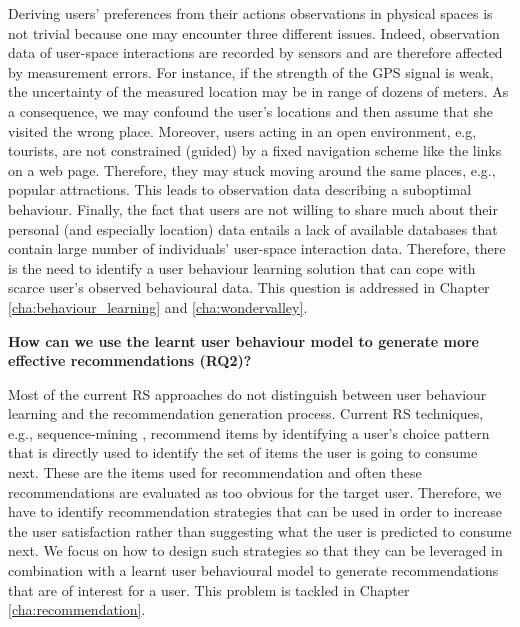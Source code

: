 Deriving users' preferences from their actions observations in physical spaces is not trivial because one may encounter three different issues.
Indeed, observation data of user-space interactions are recorded by sensors and are therefore affected by measurement errors. For instance, if the strength of the GPS signal is weak, the uncertainty of the measured location may be in range of dozens of meters. As a consequence, we may confound the user's locations and then assume that she visited the wrong place. Moreover, users acting in an open environment, e.g, tourists, are not constrained (guided) by a fixed navigation scheme like the links on a web page. Therefore, they may stuck moving around the same places, e.g., popular attractions. This leads to observation data describing a suboptimal behaviour. Finally, the fact that users are not willing to share much about their personal (and especially location) data \cite{location_privacy:Poikela2014} entails a lack of available databases that contain large number of individuals' user-space interaction data.
Therefore, there is the need to identify a user behaviour learning solution that can cope with scarce user's observed behavioural data. %
This question is addressed in Chapter \ref{cha:behaviour_learning} and \ref{cha:wondervalley}. \newline

\noindent\textbf{How can we use the learnt user behaviour model to generate more effective recommendations (RQ2)?}

Most of the current RS approaches do not distinguish between user behaviour learning and the recommendation  generation process. Current RS techniques, e.g., sequence-mining \cite{mobasher:2002, jannach2017}, recommend items by identifying a user's choice pattern that is directly used to identify the set of items the user is going to consume next. These are the items used for recommendation and often these recommendations are evaluated as too obvious for the target user.
Therefore, we have to identify recommendation strategies that can be used in order to increase the user satisfaction rather than suggesting what the user is predicted to consume next.
We focus on how to design such strategies so that they can be leveraged in combination with a learnt user behavioural model to generate recommendations that are of interest for a user. This problem is tackled in Chapter \ref{cha:recommendation}. \newline

